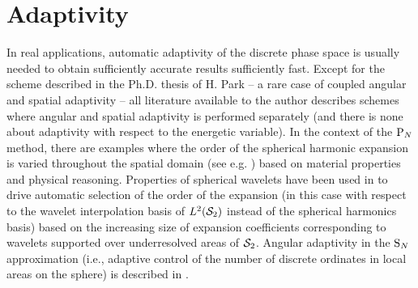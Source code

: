 \section{Adaptivity}
In real applications, automatic adaptivity of the discrete phase space is usually needed to obtain sufficiently accurate
results sufficiently fast. Except for the scheme described in the Ph.D. thesis of H. Park \cite{Park} -- a rare case of 
 coupled angular and spatial adaptivity -- all literature available to the author describes schemes where angular and
spatial adaptivity is performed separately (and there is none about adaptivity with respect to the energetic variable). 
In the context of the $\PN$ method, there are examples where the order of the spherical harmonic expansion is varied 
throughout the spatial domain (see e.g. \cite{Ackroyd2}) based on material properties and physical reasoning. Properties
of spherical wavelets have been used in \cite{Buchan} to drive automatic selection of the order of the expansion  (in
this case with respect to the wavelet interpolation basis of $\Lp[2](\Sphere)$ instead of the spherical harmonics basis)
based on the increasing size of expansion coefficients corresponding to wavelets supported over underresolved areas of 
$\Sphere$. Angular adaptivity in the $\SN$ approximation (i.e., adaptive control of the number of discrete ordinates in 
local areas on the sphere) is described in \cite{Jarrell}.

